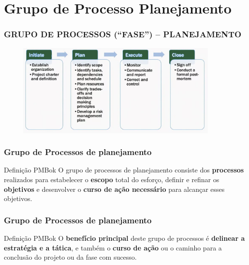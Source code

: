 \section{Grupo de Processo Planejamento}

\begin{frame}
 \frametitle{GRUPO DE PROCESSOS (“FASE”) – PLANEJAMENTO}
  \begin{figure}
   \centering
   \includegraphics[width = 0.9\textwidth]{figs/fig0.png}
  \end{figure}
\end{frame}

\begin{frame}
 \frametitle{Grupo de Processos de planejamento}
 \begin{block}{Definição PMBok}
  O grupo de processos de planejamento consiste dos \textbf{processos} realizados para estabelecer o \textbf{escopo}
total do esforço, definir e refinar os \textbf{objetivos} e desenvolver o  \textbf{curso de ação necessário} para alcançar esses
objetivos.
 \end{block}
\end{frame}

\begin{frame}
 \frametitle{Grupo de Processos de planejamento}
 \begin{block}{Definição PMBok}
O \textbf{benefício principal} deste grupo de
processos é \textbf{delinear a estratégia e a tática}, e também o \textbf{curso de ação} ou o caminho para a conclusão do
projeto ou da fase com sucesso.
\end{block}
\end{frame}

